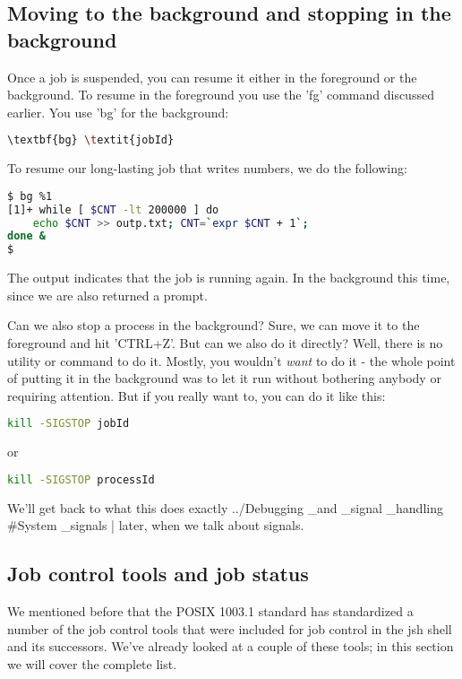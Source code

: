\subsection{Moving to the background and stopping in the background}
Once a job is suspended, you can resume it either in the foreground or the
background. To resume in the foreground you use the 'fg' command discussed
earlier. You use 'bg' for the background:
\lstset{basicstyle=\scriptsize, numbers=left, captionpos=b, tabsize=4}
\begin{lstlisting}[language={bash},
xleftmargin=15pt]
\textbf{bg} \textit{jobId}
\end{lstlisting}

To resume our long-lasting job that writes numbers, we do the following:
\lstset{basicstyle=\scriptsize, numbers=left, captionpos=b, tabsize=4}
\begin{lstlisting}[caption=Resuming the job in the background,language={bash},
breaklines=true,xleftmargin=15pt, label=lst:Resuming the job in the background]
$ bg %1
[1]+ while [ $CNT -lt 200000 ] do
    echo $CNT >> outp.txt; CNT=`expr $CNT + 1`;
done &
$
\end{lstlisting}

The output indicates that the job is running again. In the background this
time, since we are also returned a prompt.

Can we also stop a process in the background? Sure, we can move it to the
foreground and hit 'CTRL+Z'. But can we also do it directly? Well, there is no
utility or command to do it. Mostly, you wouldn't \textit{want} to do it - the
whole point of putting it in the background was to let it run without bothering
anybody or requiring attention. But if you really want to, you can do it like
this:
\lstset{basicstyle=\scriptsize, numbers=left, captionpos=b, tabsize=4}
\begin{lstlisting}[language={bash},
xleftmargin=15pt]
kill -SIGSTOP jobId
\end{lstlisting}

or 
\lstset{basicstyle=\scriptsize, numbers=left, captionpos=b, tabsize=4}
\begin{lstlisting}[language={bash},
xleftmargin=15pt]
kill -SIGSTOP processId
\end{lstlisting}

We'll get back to what this does exactly
../Debugging \_and \_signal \_handling \#System \_signals | later, when we talk about
signals.

\subsection{Job control tools and job status}
We mentioned before that the POSIX 1003.1 standard has standardized a number of
the job control tools that were included for job control in the jsh shell and
its successors. We've already looked at a couple of these tools; in this
section we will cover the complete list.

